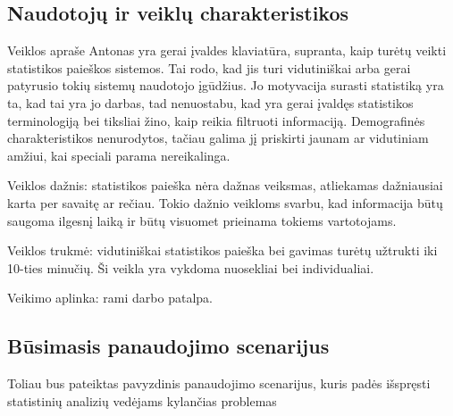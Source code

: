 \documentclass{VUMIFPSkursinis}
\begin{document}
\subsection{Naudotojų ir veiklų charakteristikos}
Veiklos apraše Antonas yra gerai įvaldes klaviatūra, supranta, kaip turėtų veikti statistikos paieškos sistemos. Tai rodo, kad jis turi vidutiniškai arba gerai patyrusio tokių sistemų naudotojo įgūdžius. Jo motyvacija surasti statistiką yra ta, kad tai yra jo darbas, tad nenuostabu, kad yra gerai įvaldęs statistikos terminologiją bei tiksliai žino, kaip reikia filtruoti informaciją. Demografinės charakteristikos nenurodytos, tačiau galima jį priskirti jaunam ar vidutiniam amžiui, kai speciali parama nereikalinga. 

Veiklos dažnis: statistikos paieška nėra dažnas veiksmas, atliekamas dažniausiai karta per savaitę ar rečiau. Tokio dažnio veikloms svarbu, kad informacija būtų saugoma ilgesnį laiką ir būtų visuomet prieinama tokiems vartotojams. 

Veiklos trukmė: vidutiniškai statistikos paieška bei gavimas turėtų užtrukti iki 10-ties minučių. Ši veikla yra vykdoma nuosekliai bei individualiai.

Veikimo aplinka: rami darbo patalpa. 

\subsection{Būsimasis panaudojimo scenarijus}
Toliau bus pateiktas pavyzdinis panaudojimo scenarijus, kuris padės išspręsti statistinių analizių vedėjams kylančias problemas
\end{document}
